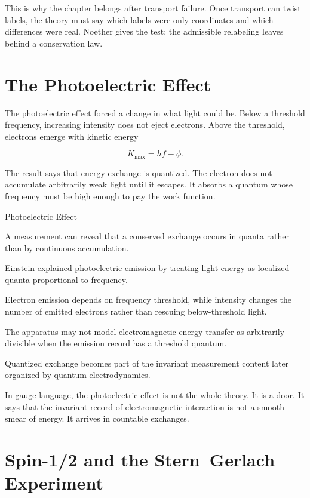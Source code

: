 This is why the chapter belongs after transport failure. Once transport can
twist labels, the theory must say which labels were only coordinates and which
differences were real. Noether gives the test: the admissible relabeling leaves
behind a conservation law.

\section{The Photoelectric Effect}
\label{se:the-photoelectric-effect}

The photoelectric effect forced a change in what light could be. Below a
threshold frequency, increasing intensity does not eject electrons. Above the
threshold, electrons emerge with kinetic energy

\[
K_{\max} = hf - \phi.
\label{eq:chapter10-photoelectric}
\]

The result says that energy exchange is quantized. The electron does not
accumulate arbitrarily weak light until it escapes. It absorbs a quantum whose
frequency must be high enough to pay the work function.

\begin{phenom}{Photoelectric Effect}
\label{ph:photoelectric-effect}

\PhStatement A measurement can reveal that a conserved exchange occurs in
quanta rather than by continuous accumulation.

\PhOrigin Einstein explained photoelectric emission by treating light energy as
localized quanta proportional to frequency.

\PhObservation Electron emission depends on frequency threshold, while
intensity changes the number of emitted electrons rather than rescuing
below-threshold light.

\PhConstraint The apparatus may not model electromagnetic energy transfer as
arbitrarily divisible when the emission record has a threshold quantum.

\PhConsequence Quantized exchange becomes part of the invariant measurement
content later organized by quantum electrodynamics.

\end{phenom}

In gauge language, the photoelectric effect is not the whole theory. It is a
door. It says that the invariant record of electromagnetic interaction is not a
smooth smear of energy. It arrives in countable exchanges.

\section{Spin-1/2 and the Stern--Gerlach Experiment}
\label{se:spin-half-and-stern-gerlach}

